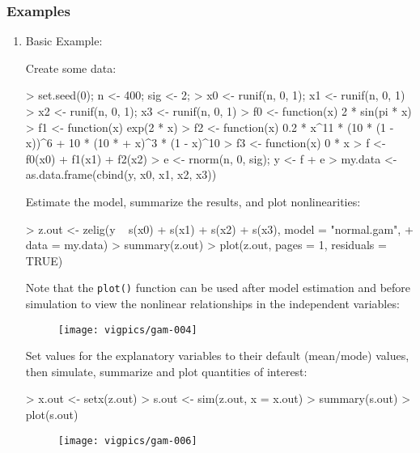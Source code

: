 \subsubsection{Examples}
\begin{enumerate}
\item Basic Example:

Create some data:

\begin{Schunk}
\begin{Sinput}
> set.seed(0);  n <- 400; sig <- 2; 
> x0 <- runif(n, 0, 1);  x1 <- runif(n, 0, 1)
> x2 <- runif(n, 0, 1);  x3 <- runif(n, 0, 1)
> f0 <- function(x) 2 * sin(pi * x)
> f1 <- function(x) exp(2 * x)
> f2 <- function(x) 0.2 * x^11 * (10 * (1 - x))^6 + 10 * (10 * 
+     x)^3 * (1 - x)^10
> f3 <- function(x) 0 * x
> f <- f0(x0) + f1(x1) + f2(x2)
> e <- rnorm(n, 0, sig); y <- f + e
> my.data <- as.data.frame(cbind(y, x0, x1, x2, x3))
\end{Sinput}
\end{Schunk}

Estimate the model, summarize the results, and plot nonlinearities:

\begin{Schunk}
\begin{Sinput}
> z.out <- zelig(y ~ s(x0) + s(x1) + s(x2) + s(x3), model = "normal.gam", 
+     data = my.data)
> summary(z.out)
> plot(z.out, pages = 1, residuals = TRUE)
\end{Sinput}
\end{Schunk}
Note that the {\tt plot()} function can be used after model estimation and before simulation to view the nonlinear relationships in the independent variables: 

\begin{figure}[here]
\centering
\texttt{[image: vigpics/gam-004]}
\label{fig:plotgam}
\end{figure}

Set values for the explanatory variables to their default (mean/mode) values, then simulate, summarize and plot quantities of interest:
\begin{Schunk}
\begin{Sinput}
> x.out <- setx(z.out)
> s.out <- sim(z.out, x = x.out)
> summary(s.out)
> plot(s.out)
\end{Sinput}
\end{Schunk}

\begin{figure}[here]
\centering
\texttt{[image: vigpics/gam-006]}
\label{fig:plotgam}
\end{figure}


\end{enumerate}

